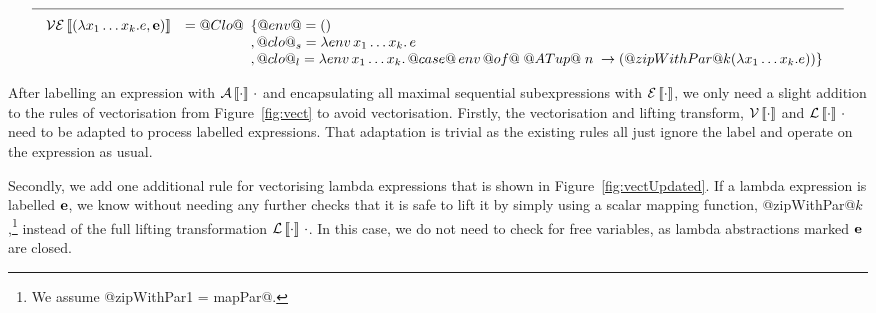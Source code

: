\begin{figure*}
$$\begin{array}{c}
\hline \\[-2mm] 
\begin{array}{rcll}
\VE{(\lambda{x_1 \ldots x_k}.e, \AVE)} 
  & \multicolumn{2}{l}{= @Clo@\begin{array}[t]{l} 
              \{ @env@ = () \\
              , @clo@_s = \lambda{env\,{x_1 \ldots x_k}}.\,e \\
              , @clo@_l = \lambda env\,{x_1 \ldots x_k}.\,
                 @case@\, env\, @of@\; @ATup@\; n\; \to (@zipWithPar@k (\lambda{x_1 \ldots x_k}.e)) \}
           \end{array}} \\
           \end{array}
\end{array}$$
\caption{Modified vectorisation rules for lambda abstractions} 
\label{fig:vectUpdated}
\end{figure*}
%
After labelling an expression with $\mathcal{A}\left\llbracket \cdot \right\rrbracket\,\cdot$ and encapsulating all maximal sequential subexpressions with $\mathcal{E}\left\llbracket \cdot \right\rrbracket$, we only need a slight addition to the rules of vectorisation from Figure~\ref{fig:vect} to avoid vectorisation. Firstly, the vectorisation and lifting transform, $\mathcal{V}\left\llbracket \cdot \right\rrbracket$ and $\mathcal{L}\left\llbracket \cdot \right\rrbracket\,\cdot$ need to be adapted to process labelled expressions. That adaptation is trivial as the existing rules all just ignore the label and operate on the expression as usual.

Secondly, we add one additional rule for vectorising lambda expressions that is shown in Figure~\ref{fig:vectUpdated}. If a lambda expression is labelled $\mathbf{e}$, we know without needing any further checks that it is safe to lift it by simply using a scalar mapping function, @zipWithPar@$k$,\footnote{We assume @zipWithPar1 = mapPar@.} instead of the full lifting transformation $\mathcal{L}\left\llbracket \cdot \right\rrbracket\,\cdot$. In this case, we do not need to check for free variables, as lambda abstractions marked $\mathbf{e}$ are closed.
